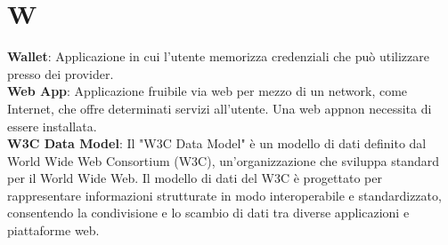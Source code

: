 \section{W}
\textbf{Wallet}: Applicazione in cui l'utente memorizza credenziali che può utilizzare presso dei provider.\\ %
\textbf{Web App}: Applicazione fruibile via web per mezzo di un network, come Internet, che offre determinati servizi all'utente. Una web app\glo non necessita di essere installata.\\
\textbf{W3C Data Model}: Il "W3C Data Model" è un modello di dati definito dal World Wide Web Consortium (W3C), un'organizzazione che sviluppa standard per il World Wide Web. Il modello di dati del W3C è progettato per rappresentare informazioni strutturate in modo interoperabile e standardizzato, consentendo la condivisione e lo scambio di dati tra diverse applicazioni e piattaforme web.\\